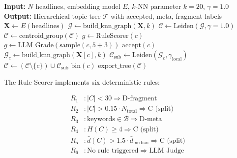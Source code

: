 \documentclass[10pt,twocolumn,twoside]{article}
\begin{document}
\begin{algorithm}[h]
\caption{Hierarchical News Topic Catalog Pipeline}
\label{alg:pipeline}
\small
\begin{algorithmic}[1]
\State \textbf{Input:} $N$ headlines, embedding model $E$, $k$-NN parameter $k=20$, $\gamma=1.0$
\State \textbf{Output:} Hierarchical topic tree $\mathcal{T}$ with accepted, meta, fragment labels
\State
\State $\mathbf{X} \gets E(\text{headlines})$ 
\State $\mathcal{G} \gets \text{build\_knn\_graph}(\mathbf{X}, k)$ 
\State $\mathcal{C} \gets \text{Leiden}(\mathcal{G}, \gamma=1.0)$ 
\State $\mathcal{C} \gets \text{centroid\_group}(\mathcal{C})$ 
\State
{}
        \State $g \gets \text{RuleScorer}(c)$ 
            \State $g \gets \text{LLM\_Grade}(\text{sample}(c, 5+3))$ 
        \EndIf
            \State $\text{accept}(c)$
            \State $\mathcal{G}_c \gets \text{build\_knn\_graph}(\mathbf{X}[c], k)$ 
            \State $\mathcal{C}_{\text{sub}} \gets \text{Leiden}(\mathcal{G}_c, \gamma_{\text{local}})$
            \State $\mathcal{C} \gets (\mathcal{C} \setminus \{c\}) \cup \mathcal{C}_{\text{sub}}$ 
            \State $\text{bin}(c)$ 
        \EndIf
    \EndFor
\EndWhile
\State \Return $\text{export\_tree}(\mathcal{C})$
\end{algorithmic}
\end{algorithm}

The Rule Scorer implements six deterministic rules:

\begin{align}
R_1 &: |C| < 30 \Rightarrow \text{D-fragment} \label{eq:r1} \\
R_2 &: |C| > 0.15 \cdot N_{\text{total}} \Rightarrow \text{C (split)} \label{eq:r2} \\
R_3 &: \text{keywords} \in \mathcal{B} \Rightarrow \text{D-meta} \label{eq:r3} \\
R_4 &: H(C) \geq 4 \Rightarrow \text{C (split)} \label{eq:r4} \\
R_5 &: \bar{d}(C) > 1.5 \cdot \bar{d}_{\text{median}} \Rightarrow \text{C (split)} \label{eq:r5} \\
R_6 &: \text{No rule triggered} \Rightarrow \text{LLM Judge} \label{eq:r6}
\end{align}
\end{document}
